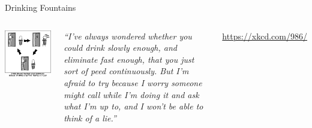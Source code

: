 
\begin{frame}[t,plain]
\titlepage
\end{frame}


\begin{frame}{Drinking Fountains}
%
\begin{columns}
\begin{center}
\includegraphics[width=.9\linewidth]{./gfx/08-xkcd-drinking-fountains}\\
\end{center}
%
\small
	\emph{\enquote{I've always wondered whether you could drink slowly enough, and eliminate fast enough, that you just sort of peed continuously.
		  But I'm afraid to try because I worry someone might call while I'm doing it and ask what I'm up to, and I won't be able to think of a lie.}}

	\vspace{6pt}
	\url{https://xkcd.com/986/}
\end{columns}
%
\end{frame}



